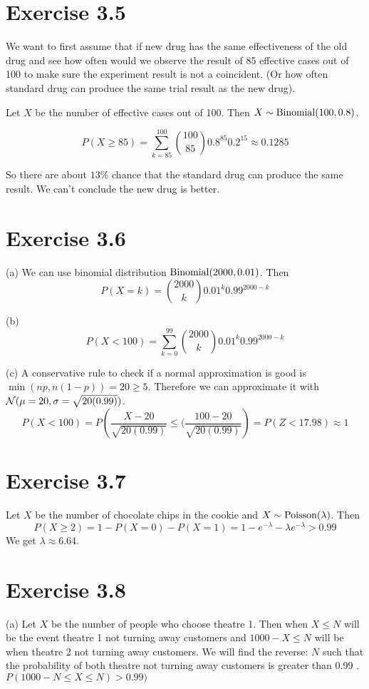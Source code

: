 \documentclass[12pt]{article}
\begin{document}
\section*{Exercise 3.5}
We want to first assume that if new drug has the same effectiveness of the old drug and see how often would we observe the result of 85 effective cases out of 100 to make sure the experiment result is not a coincident. (Or how often standard drug can produce the same trial result as the new drug).

Let $X$ be the number of effective cases out of 100. Then $X \sim \mathrm{Binomial} (100, 0.8)$.

$$P(X \geq 85) = \sum^{100}_{k=85}{100 \choose 85} 0.8^{85} 0.2^{15} \approx 0.1285$$

So there are about $13\%$ chance that the standard drug can produce the same result. We can't conclude the new drug is better.

\section*{Exercise 3.6}
(a) We can use binomial distribution $\mathrm{Binomial} (2000, 0.01)$. Then
$$ P(X= k) = {2000 \choose k} 0.01^k  0.99^{2000 -k }$$

(b) $$ P(X < 100) = \sum^{99}_{k=0} {2000 \choose k} 0.01^k  0.99^{2000 -k } $$

(c) A conservative rule to check if a normal approximation is good is $\min (np, n(1-p)) = 20 \geq 5$. Therefore we can approximate it with $\mathcal{N} (\mu=20, \sigma = \sqrt{20(0.99)}) $.
$$P ( X < 100) = P \left(\frac{X - 20}{\sqrt{20(0.99)}} \leq (\frac{100 - 20}{\sqrt{20(0.99)}}\right) = P(Z < 17.98) \approx 1 $$

\section*{Exercise 3.7}
Let $X$ be the number of chocolate chips in the cookie and $X \sim \mathrm{Poisson} (\lambda)$. Then 
$$P(X \geq 2 ) = 1 - P(X = 0) - P(X = 1) = 1 - e^{-\lambda} - \lambda e^{-\lambda} > 0.99$$
We get $\lambda \approx 6.64$.

\section*{Exercise 3.8}
(a) Let $X$ be the number of people who choose theatre 1. Then when $X \leq N$ will be the event theatre 1 not turning away customers and $1000 - X \leq N$ will be when theatre 2 not turning away customers.
We will find the reverse: $N$ such that the probability of both theatre not turning away customers is greater than 0.99 .  $P(1000 -N \leq X \leq N) > 0.99)$
\end{document}
